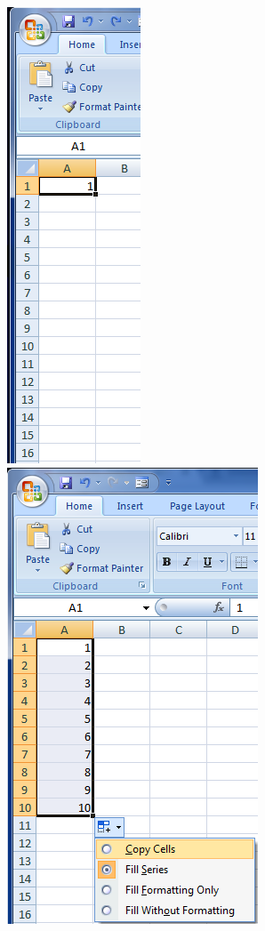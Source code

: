 \begin{figure}[t]
\centering
\includegraphics[scale=0.4]{src/images/chapter1/chapter1_fig52.png}\quad
\includegraphics[scale=0.4]{src/images/chapter1/chapter1_fig53.png}\quad

\end{figure}
